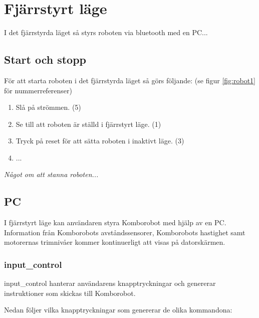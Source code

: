 
%
%


\section{Fjärrstyrt läge}
I det fjärrstyrda läget så styrs roboten via bluetooth med en PC...

\subsection{Start och stopp}
För att starta roboten i det fjärrstyrda läget så görs följande: (se figur \ref{fig:robot1} för nummerreferenser)

\begin{enumerate}
\item Slå på strömmen. (5)
\item Se till att roboten är ställd i fjärrstyrt läge. (1)
\item Tryck på reset för att sätta roboten i inaktivt läge. (3)
\item ... 
\end{enumerate}

\emph{Något om att stanna roboten...}

\subsection{PC}
I fjärrstyrt läge kan användaren styra Komborobot med hjälp av en PC.
Information från Komborobots avståndssensorer, Komborobots hastighet samt
motorernas trimnivåer kommer kontinuerligt att visas på datorskärmen.
\subsubsection{input\_control}
input\_control hanterar användarens knapptryckningar och genererar instruktioner
som skickas till Komborobot.

Nedan följer vilka knapptryckningar som genererar de olika kommandona:

